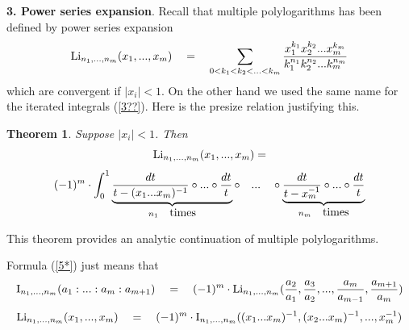 \documentclass[10pt]{article}
\newtheorem{theorem}{Theorem}[section]
\begin{document}
{\bf 3. Power series expansion}.  
Recall that multiple polylogarithms has been defined by power series expansion 
\begin{equation} \label{5}
{\rm Li}_{n_{1},...,n_{m}}(x_{1},...,x_{m})   
\quad = \quad 
\sum_{0 < k_{1} < k_{2} < ... < k_{m} } \frac{x_{1}^{k_{1}}x_{2}^{k_{2}}
... x_{m}^{k_{m}}}{k_{1}^{n_{1}}k_{2}^{n_{2}}...k_{m}^{n_{m}}}
\end{equation}
which are convergent if $|x_{i}| < 1$. On the other hand we used the same 
name for the iterated integrals (\ref{3??}). 
Here is the presize relation justifying this.

  \begin{theorem}  \label{2.3}  
Suppose $|x_{i}| < 1$. Then 
$$
{\rm Li}_{n_{1},...,n_{m}}(x_{1},...,x_{m})  = 
$$
\begin{equation} \label{5*}
(-1)^m \cdot \int_{0}^{1} \underbrace {\frac{dt}{t-(x_1...x_m)^{-1}}  \circ 
... \circ 
\frac{dt}{t} }
_{ n_{1} \quad  \mbox {\rm times}} \circ \quad
... \quad \circ \underbrace 
{\frac{dt}{t-x_m^{-1}} \circ ... 
\circ \frac{dt}{t}}_{ n_{m} \quad  \mbox {\rm times}}
\end{equation}
\end{theorem}

This theorem provides an analytic continuation of multiple polylogarithms. 

Formula (\ref{5*}) just means that  
\begin{equation} \label{5*??}
 {\rm I}_{n_{1},...,n_{m}}(a_{1}:...:a_{m}:a_{m+1})\quad  = \quad (-1)^m \cdot {\rm Li}_{n_{1},...,n_{m}}
(\frac{a_2}{a_1},\frac{a_3}{a_2},...,\frac{a_m}{a_{m-1}},\frac{a_{m+1}}{a_m})  
\end{equation}
\begin{equation} \label{5*??**??}
 {\rm Li}_{n_{1},...,n_{m}}(x_{1},...,x_{m} )\quad  = \quad (-1)^m \cdot 
{\rm I}_{n_{1},...,n_{m}}
( (x_1...x_m)^{-1},(x_2...x_m)^{-1},...,x_m^{-1})  
\end{equation}
\end{document}
